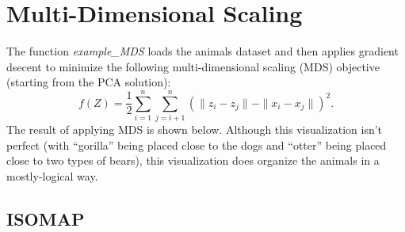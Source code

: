 \documentclass{article}
\def\norm#1{\|#1\|}
\begin{document}
\section{Multi-Dimensional Scaling}

The function \emph{example\_MDS} loads the animals dataset and then applies gradient dsecent to minimize the following multi-dimensional scaling (MDS) objective (starting from the PCA solution):
\begin{equation}
\label{eq:MDS}
f(Z) =  \frac{1}{2}\sum_{i=1}^n\sum_{j=i+1}^n (  \norm{z_i - z_j} - \norm{x_i - x_j})^2.
\end{equation}
 The result of applying MDS is shown below.
Although this visualization isn't perfect (with ``gorilla'' being placed close to the dogs and ``otter'' being placed close to two types of bears), this visualization does organize the animals in a mostly-logical way.


\subsection{ISOMAP}
\end{document}
